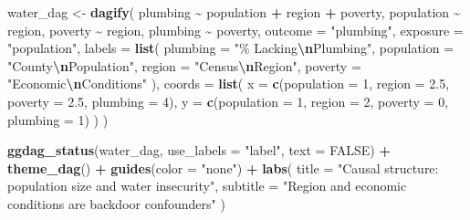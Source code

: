\documentclass[
]{article}
\newenvironment{Shaded}{\begin{snugshade}}{\end{snugshade}}
\newcommand{\AttributeTok}[1]{\textcolor[rgb]{0.13,0.29,0.53}{#1}}
\newcommand{\ConstantTok}[1]{\textcolor[rgb]{0.56,0.35,0.01}{#1}}
\newcommand{\DecValTok}[1]{\textcolor[rgb]{0.00,0.00,0.81}{#1}}
\newcommand{\FloatTok}[1]{\textcolor[rgb]{0.00,0.00,0.81}{#1}}
\newcommand{\FunctionTok}[1]{\textcolor[rgb]{0.13,0.29,0.53}{\textbf{#1}}}
\newcommand{\NormalTok}[1]{#1}
\newcommand{\OtherTok}[1]{\textcolor[rgb]{0.56,0.35,0.01}{#1}}
\newcommand{\SpecialCharTok}[1]{\textcolor[rgb]{0.81,0.36,0.00}{\textbf{#1}}}
\newcommand{\StringTok}[1]{\textcolor[rgb]{0.31,0.60,0.02}{#1}}
\begin{document}
\begin{Shaded}
\begin{Highlighting}[]
\NormalTok{water\_dag }\OtherTok{\textless{}{-}} \FunctionTok{dagify}\NormalTok{(}
\NormalTok{  plumbing    }\SpecialCharTok{\textasciitilde{}}\NormalTok{ population }\SpecialCharTok{+}\NormalTok{ region }\SpecialCharTok{+}\NormalTok{ poverty,}
\NormalTok{  population  }\SpecialCharTok{\textasciitilde{}}\NormalTok{ region,}
\NormalTok{  poverty     }\SpecialCharTok{\textasciitilde{}}\NormalTok{ region,}
\NormalTok{  plumbing    }\SpecialCharTok{\textasciitilde{}}\NormalTok{ poverty,}
  \AttributeTok{outcome  =} \StringTok{"plumbing"}\NormalTok{,}
  \AttributeTok{exposure =} \StringTok{"population"}\NormalTok{,}
  \AttributeTok{labels =} \FunctionTok{list}\NormalTok{(}
    \AttributeTok{plumbing   =} \StringTok{"\% Lacking}\SpecialCharTok{\textbackslash{}n}\StringTok{Plumbing"}\NormalTok{,}
    \AttributeTok{population =} \StringTok{"County}\SpecialCharTok{\textbackslash{}n}\StringTok{Population"}\NormalTok{,}
    \AttributeTok{region     =} \StringTok{"Census}\SpecialCharTok{\textbackslash{}n}\StringTok{Region"}\NormalTok{,}
    \AttributeTok{poverty    =} \StringTok{"Economic}\SpecialCharTok{\textbackslash{}n}\StringTok{Conditions"}
\NormalTok{  ),}
  \AttributeTok{coords =} \FunctionTok{list}\NormalTok{(}
    \AttributeTok{x =} \FunctionTok{c}\NormalTok{(}\AttributeTok{population =} \DecValTok{1}\NormalTok{, }\AttributeTok{region =} \FloatTok{2.5}\NormalTok{, }\AttributeTok{poverty =} \FloatTok{2.5}\NormalTok{, }\AttributeTok{plumbing =} \DecValTok{4}\NormalTok{),}
    \AttributeTok{y =} \FunctionTok{c}\NormalTok{(}\AttributeTok{population =} \DecValTok{1}\NormalTok{, }\AttributeTok{region =} \DecValTok{2}\NormalTok{,   }\AttributeTok{poverty =} \DecValTok{0}\NormalTok{,   }\AttributeTok{plumbing =} \DecValTok{1}\NormalTok{)}
\NormalTok{  )}
\NormalTok{)}

\FunctionTok{ggdag\_status}\NormalTok{(water\_dag, }\AttributeTok{use\_labels =} \StringTok{"label"}\NormalTok{, }\AttributeTok{text =} \ConstantTok{FALSE}\NormalTok{) }\SpecialCharTok{+}
  \FunctionTok{theme\_dag}\NormalTok{() }\SpecialCharTok{+}
  \FunctionTok{guides}\NormalTok{(}\AttributeTok{color =} \StringTok{"none"}\NormalTok{) }\SpecialCharTok{+}
  \FunctionTok{labs}\NormalTok{(}
    \AttributeTok{title    =} \StringTok{"Causal structure: population size and water insecurity"}\NormalTok{,}
    \AttributeTok{subtitle =} \StringTok{"Region and economic conditions are backdoor confounders"}
\NormalTok{  )}
\end{Highlighting}
\end{Shaded}
\end{document}
